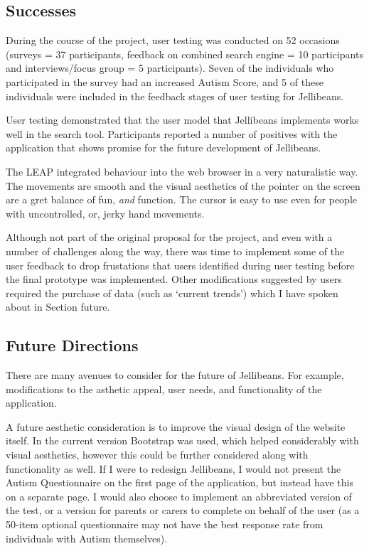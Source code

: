 \documentclass[a4paper, 11pt]{article}
\begin{document}
\subsection{Successes}
During the course of the project, user testing was conducted on 52 occasions (surveys = 37 participants, feedback on combined search engine = 10 participants and interviews/focus group = 5 participants). Seven of the individuals who participated in the survey had an increased Autism Score, and 5 of these individuals were included in the feedback stages of user testing for Jellibeans. 

\vspace{5mm}
User testing demonstrated that the user model that Jellibeans implements works well in the search tool. Participants reported a number of positives with the application that shows promise for the future development of Jellibeans.

\vspace{5mm}
The LEAP integrated behaviour into the web browser in a very naturalistic way. The movements are smooth and the visual aesthetics of the pointer on the screen are a gret balance of fun, \textit{and} function. The cursor is easy to use even for people with uncontrolled, or, jerky hand movements. 

\vspace{5mm}
Although not part of the original proposal for the project, and even with a number of challenges along the way, there was time to implement some of the user feedback to drop frustations that users identified during user testing before the final prototype was implemented. Other modifications suggested by users required the purchase of data (such as `current trends') which I have spoken about in Section {future}.

\subsection{Future Directions}\label{future}
There are many avenues to consider for the future of Jellibeans. For example, modifications to the asthetic appeal, user needs, and functionality of the application.

\vspace{5mm}
A future aesthetic consideration is to improve the visual design of the website itself. In the current version Bootstrap was used, which helped considerably with visual aesthetics, however this could be further considered along with functionality as well. If I were to redesign Jellibeans, I would not present the Autism Questionnaire on the first page of the application, but instead have this on a separate page. I would also choose to implement an abbreviated version of the test, or a version for parents or carers to complete on behalf of the user (as a 50-item optional questionnaire may not have the best response rate from individuals with Autism themselves).
\end{document}
